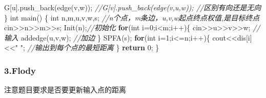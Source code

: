 \documentclass[
]{article}
\newenvironment{Shaded}{}{}
\newcommand{\CommentTok}[1]{\textcolor[rgb]{0.38,0.63,0.69}{\textit{#1}}}
\newcommand{\ControlFlowTok}[1]{\textcolor[rgb]{0.00,0.44,0.13}{\textbf{#1}}}
\newcommand{\DataTypeTok}[1]{\textcolor[rgb]{0.56,0.13,0.00}{#1}}
\newcommand{\DecValTok}[1]{\textcolor[rgb]{0.25,0.63,0.44}{#1}}
\newcommand{\NormalTok}[1]{#1}
\newcommand{\OperatorTok}[1]{\textcolor[rgb]{0.40,0.40,0.40}{#1}}
\newcommand{\StringTok}[1]{\textcolor[rgb]{0.25,0.44,0.63}{#1}}
\begin{document}
\begin{Shaded}
\begin{Highlighting}[]
\NormalTok{	G}\OperatorTok{[}\NormalTok{u}\OperatorTok{].}\NormalTok{push\_back}\OperatorTok{(}\NormalTok{edge}\OperatorTok{(}\NormalTok{v}\OperatorTok{,}\NormalTok{w}\OperatorTok{));} 
	\CommentTok{//G[v].push\_back(edge(v,u,w)); //区别有向还是无向}
\OperatorTok{\}}
\DataTypeTok{int}\NormalTok{ main}\OperatorTok{()}
\OperatorTok{\{}
	\DataTypeTok{int}\NormalTok{ n}\OperatorTok{,}\NormalTok{m}\OperatorTok{,}\NormalTok{u}\OperatorTok{,}\NormalTok{v}\OperatorTok{,}\NormalTok{w}\OperatorTok{,}\NormalTok{s}\OperatorTok{;} \CommentTok{//n个点，m条边，u,v,w起点终点权值,是目标终点}
\NormalTok{	cin}\OperatorTok{\textgreater{}\textgreater{}}\NormalTok{n}\OperatorTok{\textgreater{}\textgreater{}}\NormalTok{m}\OperatorTok{\textgreater{}\textgreater{}}\NormalTok{s}\OperatorTok{;}
\NormalTok{	Init}\OperatorTok{(}\NormalTok{n}\OperatorTok{);}\CommentTok{//初始化}
	\ControlFlowTok{for}\OperatorTok{(}\DataTypeTok{int}\NormalTok{ i}\OperatorTok{=}\DecValTok{0}\OperatorTok{;}\NormalTok{i}\OperatorTok{\textless{}}\NormalTok{m}\OperatorTok{;}\NormalTok{i}\OperatorTok{++)\{}
\NormalTok{		cin}\OperatorTok{\textgreater{}\textgreater{}}\NormalTok{u}\OperatorTok{\textgreater{}\textgreater{}}\NormalTok{v}\OperatorTok{\textgreater{}\textgreater{}}\NormalTok{w}\OperatorTok{;}  \CommentTok{//输入 }
\NormalTok{		addedge}\OperatorTok{(}\NormalTok{u}\OperatorTok{,}\NormalTok{v}\OperatorTok{,}\NormalTok{w}\OperatorTok{);} \CommentTok{//加边 }
	\OperatorTok{\}}
\NormalTok{	SPFA}\OperatorTok{(}\NormalTok{s}\OperatorTok{);} 
	\ControlFlowTok{for}\OperatorTok{(}\DataTypeTok{int}\NormalTok{ i}\OperatorTok{=}\DecValTok{1}\OperatorTok{;}\NormalTok{i}\OperatorTok{\textless{}=}\NormalTok{n}\OperatorTok{;}\NormalTok{i}\OperatorTok{++)\{}
\NormalTok{		cout}\OperatorTok{\textless{}\textless{}}\NormalTok{dis}\OperatorTok{[}\NormalTok{i}\OperatorTok{]\textless{}\textless{}}\StringTok{" "}\OperatorTok{;}  \CommentTok{//输出到每个点的最短距离 }
	\OperatorTok{\}}
	\ControlFlowTok{return} \DecValTok{0}\OperatorTok{;}
\OperatorTok{\}}
\end{Highlighting}
\end{Shaded}

\hypertarget{3flody}{%
\subsubsection{3.Flody}\label{3flody}}

注意题目要求是否要更新输入点的距离
\end{document}
